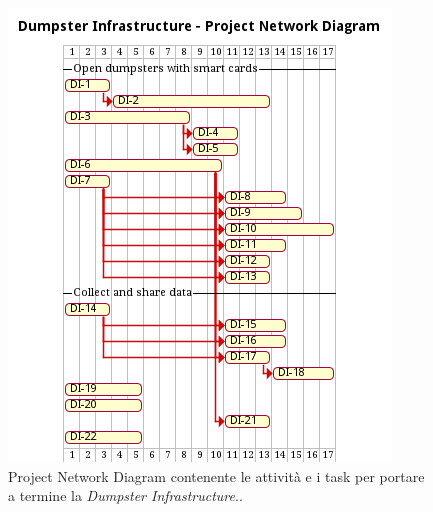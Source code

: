 \begin{figure}[H]
    \centering
    \includegraphics[width=\textwidth]{../img/gantt-dumpster-infrastructure.pm}
    \caption{Project Network Diagram contenente le attività e i task per portare a termine la \textit{Dumpster Infrastructure}..}
    \label{fig:gantt-dumpster-infrastructure}
\end{figure}

